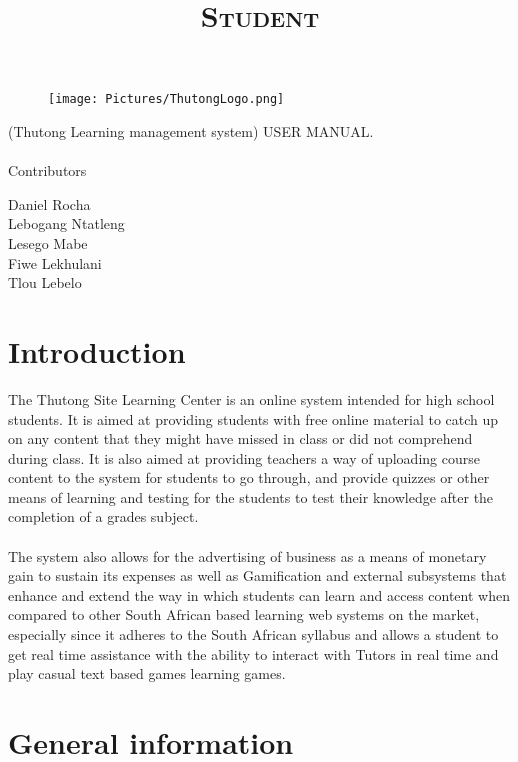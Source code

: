\documentclass[english]{article}
\title{\scshape\Large Student}
\begin{document}
	
	\begin{figure}
		\texttt{[image: Pictures/ThutongLogo.png]}
	\end{figure}
	
	(Thutong Learning management system) USER MANUAL. \\\\
	
	
	Contributors
 
\begin{list}{•}
  \item Daniel Rocha \\
  Lebogang Ntatleng \\
  Lesego Mabe \\
  Fiwe Lekhulani \\
  Tlou Lebelo
\end{list}


	\newpage
	
	\tableofcontents

	\newpage


	\section{Introduction}
The Thutong Site Learning Center is an online system intended for high school students. It is aimed at providing students with free online material to catch up on any content that they might have missed in class or did not comprehend during class. It is also aimed at providing teachers a way of uploading course content to the system for students to go through, and provide quizzes or other means of learning and testing for the students to test their knowledge after the completion of a grades subject.\\ \\ The system also allows for the advertising of business as a means of monetary gain to sustain its expenses as well as  Gamification and external subsystems that enhance and extend the way in which students can learn and access content when compared to other South African based learning web systems on the market, especially since it adheres to the South African syllabus and allows a student to get real time assistance with the ability to interact with Tutors in real time and play casual text based games learning games.


\section{General information}
\end{document}
